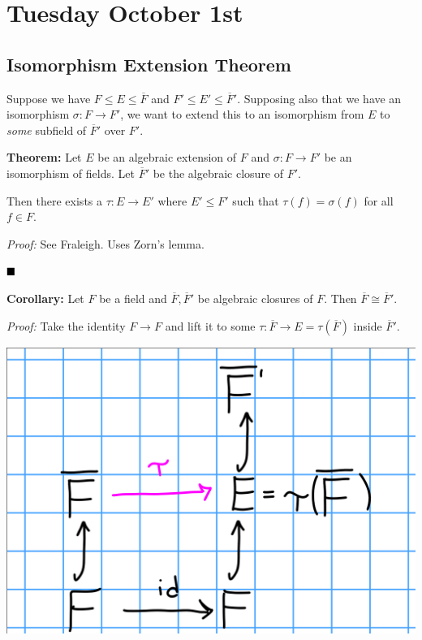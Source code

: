 \hypertarget{tuesday-october-1st}{%
\section{Tuesday October 1st}\label{tuesday-october-1st}}

\hypertarget{isomorphism-extension-theorem}{%
\subsection{Isomorphism Extension
Theorem}\label{isomorphism-extension-theorem}}

Suppose we have \(F\leq E \leq \overline F\) and
\(F' \leq E' \leq \overline{F}'\). Supposing also that we have an
isomorphism \(\sigma: F \to F'\), we want to extend this to an
isomorphism from \(E\) to \emph{some} subfield of \(\overline{F}'\) over
\(F'\).

\textbf{Theorem:} Let \(E\) be an algebraic extension of \(F\) and
\(\sigma: F \to F'\) be an isomorphism of fields. Let \(\overline{F}'\)
be the algebraic closure of \(F'\).

Then there exists a \(\tau: E \to E'\) where \(E' \leq F'\) such that
\(\tau(f) = \sigma(f)\) for all \(f \in F\).

\emph{Proof:} See Fraleigh. Uses Zorn's lemma.

\(\qed\)

\textbf{Corollary:} Let \(F\) be a field and
\(\overline F, \overline F'\) be algebraic closures of \(F\). Then
\(\overline F \cong \overline F'\).

\emph{Proof:} Take the identity \(F \to F\) and lift it to some
\(\tau: \overline F \to E = \tau(\overline F)\) inside
\(\overline F '\).

\includegraphics{figures/2019-10-01-09:40.png}\\

